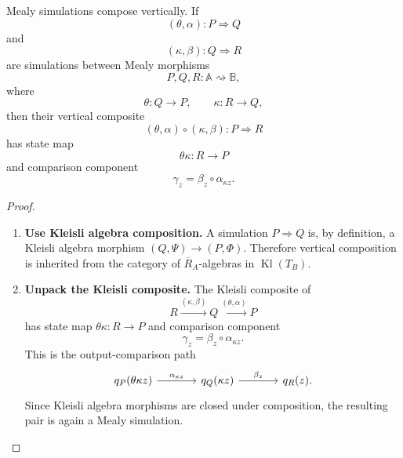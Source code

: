 \begin{proposition}
\label{prop:mealy-simulations-vertical-composition}
    Mealy simulations compose vertically. If
    \[
        (\theta,\alpha):P\Rightarrow Q
    \]
    and
    \[
        (\kappa,\beta):Q\Rightarrow R
    \]
    are simulations between Mealy morphisms
    \[
        P,Q,R:\mathbb A\rightsquigarrow\mathbb B,
    \]
    where
    \[
        \theta:Q\to P,
        \qquad
        \kappa:R\to Q,
    \]
    then their vertical composite
    \[
        (\theta,\alpha)\circ(\kappa,\beta):P\Rightarrow R
    \]
    has state map
    \[
        \theta\kappa:R\to P
    \]
    and comparison component
    \[
        \gamma_z=\beta_z\circ\alpha_{\kappa z}.
    \]
\end{proposition}
\begin{proof}
    \leavevmode
    \begin{enumerate}
        \item \textbf{Use Kleisli algebra composition.} A simulation \(P\Rightarrow Q\) is, by definition, a Kleisli algebra morphism \((Q,\Psi)\to(P,\Phi)\). Therefore vertical composition is inherited from the category of \(\overline R_A\)-algebras in \(\operatorname{Kl}(T_B)\).

        \item \textbf{Unpack the Kleisli composite.} The Kleisli composite of
        \[
            R\xrightarrow{(\kappa,\beta)}Q
            \xrightarrow{(\theta,\alpha)}P
        \]
        has state map \(\theta\kappa:R\to P\) and comparison component
        \[
            \gamma_z=\beta_z\circ\alpha_{\kappa z}.
        \]
        This is the output-comparison path
        \[
            \begin{tikzcd}[column sep=large]
                    q_P(\theta\kappa z)
                        \arrow[r, "\alpha_{\kappa z}"]
                &
                    q_Q(\kappa z)
                        \arrow[r, "\beta_z"]
                &
                    q_R(z).
            \end{tikzcd}
        \]
        Since Kleisli algebra morphisms are closed under composition, the resulting pair is again a Mealy simulation.
    \end{enumerate}
\end{proof}

